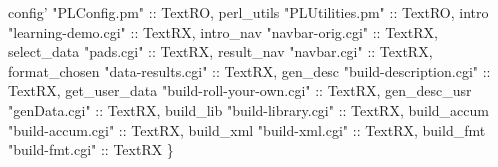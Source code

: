 \begin{code}
    config'       "PLConfig.pm"             :: TextRO,   
    perl_utils    "PLUtilities.pm"          :: TextRO,     
    intro         "learning-demo.cgi"       :: TextRX,     
    intro_nav     "navbar-orig.cgi"         :: TextRX,     
    select_data   "pads.cgi"                :: TextRX,     
    result_nav    "navbar.cgi"              :: TextRX,     
    format_chosen "data-results.cgi"        :: TextRX,     
    gen_desc      "build-description.cgi"   :: TextRX,     
    get_user_data "build-roll-your-own.cgi" :: TextRX,     
    gen_desc_usr  "genData.cgi"             :: TextRX,     
    build_lib     "build-library.cgi"       :: TextRX,     
    build_accum   "build-accum.cgi"         :: TextRX,     
    build_xml     "build-xml.cgi"           :: TextRX,     
    build_fmt     "build-fmt.cgi"           :: TextRX     
  \}
\end{code}
\mbox{}

